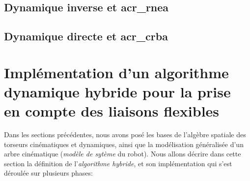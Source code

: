 \documentclass{report}
\begin{document}
\section{Dynamique inverse et \gls{acr_rnea}}

\section{Dynamique directe et \gls{acr_crba}}



\chapter{Implémentation d'un algorithme dynamique hybride pour la prise en compte des liaisons flexibles} \label{ch_impl}


Dans les sections précédentes, nous avons posé les bases de l'algèbre spatiale des torseurs cinématiques et dynamiques, ainsi que la modélisation généralisée d'un arbre cinématique (\emph{modèle de sytème} du robot). Nous allons décrire dans cette section la définition de l'\emph{algorithme hybride}, et son implémentation qui s'est déroulée sur plusieurs phases:\\
\end{document}
